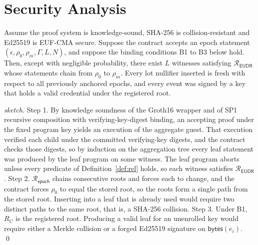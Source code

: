 \documentclass[runningheads]{llncs}
\newif\ifmarkrev
\newcommand{\rev}[1]{\ifmarkrev{\color{blue}#1}\else#1\fi}
\newcommand{\RC}{R_{C}}
\newcommand{\Rel}{\mathcal{R}_{\mathsf{EUDR}}}
\newcommand{\Repoch}{\mathcal{R}_{\mathsf{epoch}}}
\begin{document}
\section{Security Analysis}
\label{sec:security}

\begin{proposition}\label{prop:sound}
Assume the proof system is knowledge-sound, SHA-256 is collision-resistant and Ed25519 is EUF-CMA secure. Suppose the contract accepts an epoch statement $(\epsilon,\rho_0,\rho_m,\Gamma,L,N)$, and suppose the binding conditions B1 to B3 below hold. Then, except with negligible probability, there exist $L$ witnesses satisfying $\Rel$ whose statements chain from $\rho_0$ to $\rho_m$. Every lot nullifier inserted is fresh with respect to all previously anchored epochs, and every event was signed by a key that holds a valid credential under the registered root.
\end{proposition}

\begin{proof}[sketch]
Step 1. By knowledge soundness of the Groth16 wrapper and of SP1 recursive composition \rev{with verifying-key-digest binding}, an accepting proof under the fixed program key yields an execution of the aggregate guest. That execution verified each child under the committed verifying-key digests, and the contract checks those digests, so by induction on the aggregation tree every leaf statement was produced by the leaf program on some witness. The leaf program aborts unless every predicate of Definition~\ref{def:rel} holds, so each witness satisfies $\Rel$. Step 2. $\Repoch$ chains consecutive roots and forces each to change, and the contract forces $\rho_0$ to equal the stored root, so the roots form a single path from the stored root. Inserting into a leaf that is already used would require two distinct paths to the same root, that is, a SHA-256 collision. Step 3. Under B1, $\RC$ is the registered root. Producing a valid leaf for an unenrolled key would require either a Merkle collision or a forged Ed25519 signature on $\mathsf{bytes}(e_i)$. \qed
\end{proof}
\end{document}

